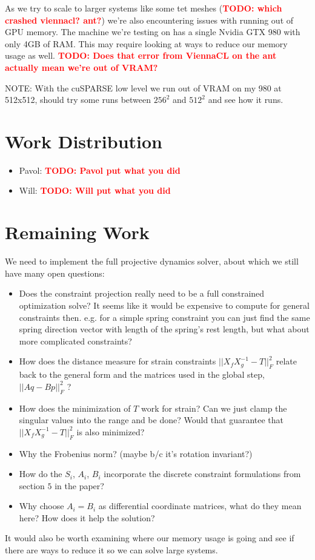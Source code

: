 \documentclass[11pt]{article}
\newcommand{\TODO}[1]{\textcolor{red}{\textbf{TODO: #1}}}
\begin{document}
As we try to scale to larger systems like some tet meshes (\TODO{which crashed viennacl? ant?}) we're
also encountering issues with running out of GPU memory. The machine we're testing on has a single
Nvidia GTX 980 with only 4GB of RAM. This may require looking at ways to reduce our memory usage
as well. \TODO{Does that error from ViennaCL on the ant actually mean we're out of VRAM?}

NOTE: With the cuSPARSE low level we run out of VRAM on my 980 at 512x512, should try some runs between
$256^2$ and $512^2$ and see how it runs.

\section{Work Distribution}

\begin{itemize}
	\item Pavol: \TODO{Pavol put what you did}
	\item Will: \TODO{Will put what you did}
\end{itemize}

\section{Remaining Work}

We need to implement the full projective dynamics solver, about which we still have many open
questions:

\begin{itemize}
	\item Does the constraint projection really need to be a full constrained optimization solve? It seems
		like it would be expensive to compute for general constraints then. e.g. for a simple spring constraint
		you can just find the same spring direction vector with length of the spring's rest length, but what
		about more complicated constraints?

	\item How does the distance measure for strain constraints $|| X_f X^{-1}_g - T ||^2_F$ relate back to the
		general form and the matrices used in the global step, $||Aq - Bp||^2_F$ ?

	\item How does the minimization of $T$ work for strain? Can we just clamp the singular values into the
		range and be done? Would that guarantee that $|| X_f X^{-1}_g - T ||^2_F$ is also minimized?

	\item Why the Frobenius norm? (maybe b/c it's rotation invariant?)
	\item How do the $S_i$, $A_i$, $B_i$ incorporate the discrete constraint formulations from
		section $5$ in the paper?
	\item Why choose $A_i = B_i$ as differential coordinate matrices, what do they
		mean here? How does it help the solution?
\end{itemize}

It would also be worth examining where our memory usage is going and see if there
are ways to reduce it so we can solve large systems.
\end{document}
